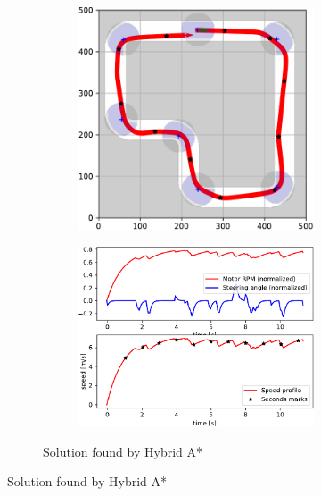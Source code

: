 \begin{figure}[!tbp]%
	\centering

	\begin{subfigure}[t]{\textwidth}
		\begin{subfigure}[t]{0.45\textwidth}
			\includegraphics[width=\textwidth]{../img/experiments/simple-hybrid_astar-trajectory}
		\end{subfigure}
		\hfill
		\begin{subfigure}[t]{0.45\textwidth}
			\includegraphics[width=\textwidth]{../img/experiments/simple-hybrid_astar-actuators}
		\end{subfigure}
		\caption{Solution found by Hybrid A*}
		\label{fig:simple-hybrid_astar}
	\end{subfigure}


\end{figure}
